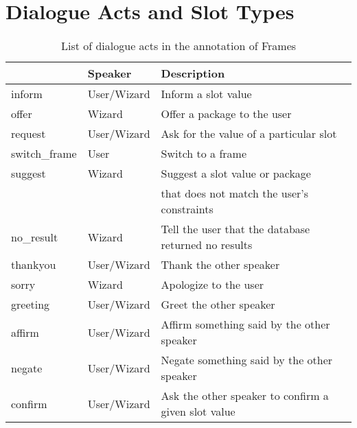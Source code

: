 \documentclass{article}
\theoremstyle{definition}
\begin{document}
\newpage

\section{Dialogue Acts and Slot Types}
\label{app:dialogue_acts}

\begin{table}[!h]
\begin{center}
\caption{List of dialogue acts in the annotation of Frames}
\begin{tabu}to  
\toprule
{} & \textbf{Speaker} & \textbf{Description}                                          \\\midrule
inform                & User/Wizard      & Inform a slot value                                           \\
offer                 & Wizard           & Offer a package to the user                                   \\
request               & User/Wizard      & Ask for the value of a particular slot                        \\
switch\_frame         & User             & Switch to a frame                                             \\
suggest               & Wizard           & Suggest a slot value or package                               \\
                      &                  & that does not match the user's constraints                    \\
no\_result            & Wizard           & Tell the user that the database returned no results           \\
thankyou              & User/Wizard      & Thank the other speaker                                       \\
sorry                 & Wizard           & Apologize to the user                                         \\
greeting              & User/Wizard      & Greet the other speaker                                       \\
affirm                & User/Wizard      & Affirm something said by the other speaker                    \\
negate                & User/Wizard      & Negate something said by the other speaker                    \\
confirm               & User/Wizard      & Ask the other speaker to confirm a given slot value           \\

\end{tabu}
\end{center}
\end{table}
\end{document}
